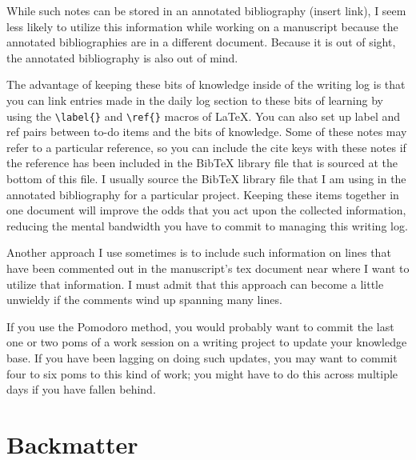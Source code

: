 \documentclass[10pt,letterpaper]{article}
\begin{document}
While such notes can be stored in an annotated bibliography (insert link), I seem less likely to utilize this information while working on a manuscript because the annotated bibliographies are in a different document.
Because it is out of sight, the annotated bibliography is also out of mind.

The advantage of keeping these bits of knowledge inside of the writing log is that you can link entries made in the daily log section to these bits of learning by using the \verb|\label{}| and \verb|\ref{}| macros of \LaTeX.
You can also set up label and ref pairs between to-do items and the bits of knowledge.
Some of these notes may refer to a particular reference, so you can include the cite keys with these notes if the reference has been included in the BibTeX library file that is sourced at the bottom of this file.
I usually source the BibTeX library file that I am using in the annotated bibliography for a particular project.
Keeping these items together in one document will improve the odds that you act upon the collected information, reducing the mental bandwidth you have to commit to managing this writing log.

Another approach I use sometimes is to include such information on lines that have been commented out in the manuscript's tex document near where I want to utilize that information.
I must admit that this approach can become a little unwieldy if the comments wind up spanning many lines.

If you use the Pomodoro method, you would probably want to commit the last one or two poms of a work session on a writing project to update your knowledge base.
If you have been lagging on doing such updates, you may want to commit four to six poms to this kind of work; you might have to do this across multiple days if you have fallen behind.


\section{Backmatter}



\printindex
\end{document}
